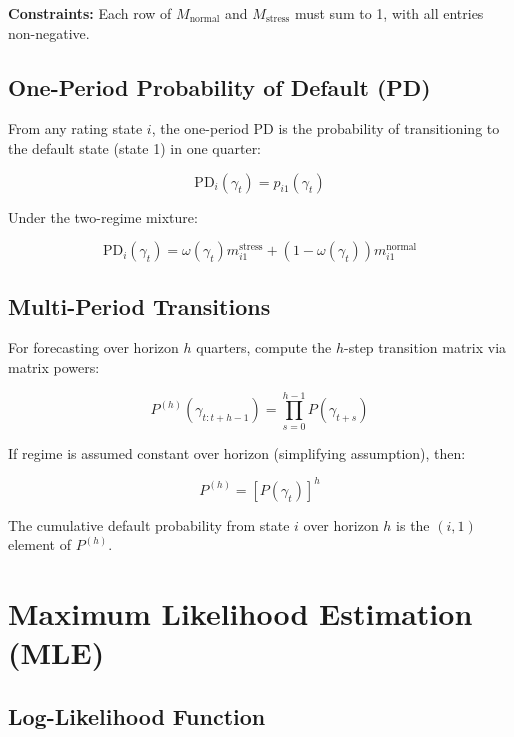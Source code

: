 \documentclass[12pt,a4paper]{article}
\newcommand{\Mnormal}{M_{\text{normal}}}
\newcommand{\Mstress}{M_{\text{stress}}}
\newcommand{\PD}{\text{PD}}
\begin{document}
\textbf{Constraints:} Each row of $\Mnormal$ and $\Mstress$ must sum to 1, with all entries non-negative.

\subsection{One-Period Probability of Default (PD)}

From any rating state $i$, the one-period PD is the probability of transitioning to the default state (state 1) in one quarter:

\begin{equation}
\PD_i(\gamma_t) = p_{i1}(\gamma_t)
\end{equation}

Under the two-regime mixture:

\begin{equation}
\label{eq:pd_mixture}
\PD_i(\gamma_t) = \omega(\gamma_t) m_{i1}^{\text{stress}} + (1 - \omega(\gamma_t)) m_{i1}^{\text{normal}}
\end{equation}

\subsection{Multi-Period Transitions}

For forecasting over horizon $h$ quarters, compute the $h$-step transition matrix via matrix powers:

\begin{equation}
P^{(h)}(\gamma_{t:t+h-1}) = \prod_{s=0}^{h-1} P(\gamma_{t+s})
\end{equation}

If regime is assumed constant over horizon (simplifying assumption), then:

\begin{equation}
P^{(h)} = [P(\gamma_t)]^h
\end{equation}

The cumulative default probability from state $i$ over horizon $h$ is the $(i,1)$ element of $P^{(h)}$.

\section{Maximum Likelihood Estimation (MLE)}

\subsection{Log-Likelihood Function}
\end{document}
